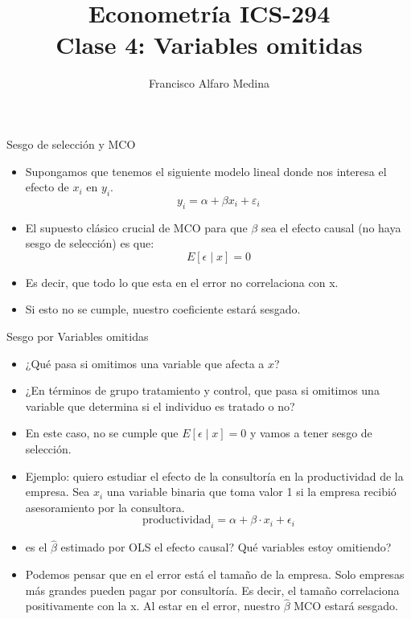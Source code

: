 \documentclass[10pt,aspectratio=169]{beamer}
\title[ICS-162]{Econometría ICS-294\\ \small{Clase 4: Variables omitidas}}
\author{Francisco Alfaro Medina}
\institute[USM]
{Universidad Técnica Federico Santa María\\ %
	\medskip
	\textit{} %
	
}
\date{}
\begin{document}
	
\begin{frame}
	\titlepage %
\end{frame}

\begin{frame}{Sesgo de selección y MCO}
    \begin{itemize}
               \item Supongamos que tenemos el siguiente modelo lineal donde nos interesa el efecto de $x_{i}$ en $y_{i}$.
        $$
        y_{i}=\alpha+\beta x_{i}+\varepsilon_{i}
        $$
        \item El supuesto cl\'asico crucial de MCO para que $\beta$ sea el efecto causal (no haya sesgo de selección) es que:
        $$
        E\left[\epsilon \mid x\right]=0
        $$
        \item Es decir, que todo lo que esta en el error no correlaciona con x.
        \item Si esto no se cumple, nuestro coeficiente estar\'a sesgado.
    \end{itemize}
\end{frame}

\begin{frame}{Sesgo por Variables omitidas}
    \begin{itemize} 
        \item ¿Qué pasa si omitimos una variable que afecta a $x$?
        \item ¿En t\'erminos de grupo tratamiento y control, que pasa si omitimos una variable que determina si el individuo es tratado o no?
        \item En este caso, no se cumple que $E\left[\epsilon \mid x\right]=0$ y vamos a tener sesgo de selecci\'on.
        \item Ejemplo: quiero estudiar el efecto de la consultor\'ia en la productividad de la empresa. Sea $x_{i}$ una variable binaria que toma valor 1 si la empresa recibi\'o asesoramiento por la consultora.
        $$
        \text{productividad}_{i}=\alpha+\beta \cdot x_{i}+\epsilon_{i}
        $$
        \item es el $\hat{\beta}$ estimado por OLS el efecto causal? Qu\'e variables estoy omitiendo?
        \item Podemos pensar que en el error est\'a el tamaño de la empresa. Solo empresas m\'as grandes pueden pagar por consultor\'ia. Es decir, el tamaño correlaciona positivamente con la x. Al estar en el error, nuestro $\hat{\beta}$ MCO estar\'a sesgado.
    \end{itemize}
\end{frame}
\end{document}
